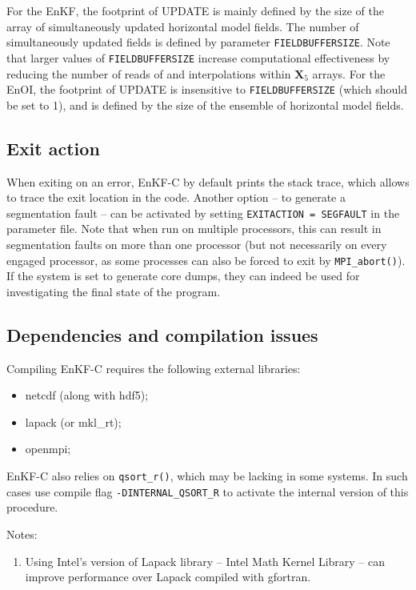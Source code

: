 \documentclass[11pt]{report}
\newcommand{\mb} {\mathbf}
\begin{document}
For the EnKF, the footprint of UPDATE is mainly defined by the size of the array of simultaneously updated horizontal model fields.
The number of simultaneously updated fields is defined by parameter \verb|FIELDBUFFERSIZE|.
Note that larger values of \verb|FIELDBUFFERSIZE| increase computational effectiveness by reducing the number of reads of and interpolations within $\mb X_5$ arrays.
For the EnOI, the footprint of UPDATE is insensitive to \verb|FIELDBUFFERSIZE| (which should be set to 1), and is defined by the size of the ensemble of horizontal model fields.

\subsection{Exit action}

When exiting on an error, EnKF-C by default prints the stack trace, which allows to trace the exit location in the code.
Another option -- to generate a segmentation fault -- can be activated by setting \verb|EXITACTION = SEGFAULT| in the parameter file.
Note that when run on multiple processors, this can result in segmentation faults on more than one processor (but not necessarily on every engaged processor, as some processes can also be forced to exit by \verb|MPI_abort()|).
If the system is set to generate core dumps, they can indeed be used for investigating the final state of the program.

\subsection{Dependencies and compilation issues}

Compiling EnKF-C requires the following external libraries:
\begin{itemize}
\item netcdf (along with hdf5);
\item lapack (or mkl\_rt);
\item openmpi;
\end{itemize}

EnKF-C also relies on \verb|qsort_r()|, which may be lacking in some systems.
In such cases use compile flag \verb|-DINTERNAL_QSORT_R| to activate the internal version of this procedure.

Notes:
\vspace{-3mm}
\begin{enumerate}
\item Using Intel's version of Lapack library -- Intel Math Kernel Library -- can improve performance over Lapack compiled with gfortran.
\end{enumerate}
\end{document}
